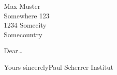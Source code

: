 \documentclass[psi]{scrlttr2}
\begin{document}
\begin{letter}{Max Muster\\
	Somewhere 123\\
	1234 Somecity\\
	Somecountry}


\opening{Dear\ldots}

\lipsum[1-5]

\closing{Yours sincerely\newline\newline Paul Scherrer Institut}

\end{letter}
\end{document}
